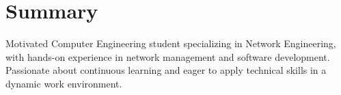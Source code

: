 \section{Summary}
\begin{onecolentry}
	Motivated Computer Engineering student specializing in Network Engineering, with hands-on experience in network management and software development. Passionate about continuous learning and eager to apply technical skills in a dynamic work environment.
\end{onecolentry}